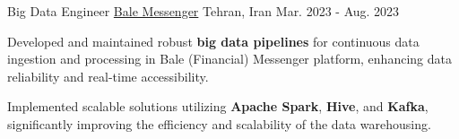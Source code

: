 

\begin{cventries}

  \cventry
    {Big Data Engineer} %
    {\href{https://bale.ai/}{Bale Messenger}} %
    {Tehran, Iran} %
    {Mar. 2023 - Aug. 2023} %
    {
      \begin{cvitems} %
        \item {Developed and maintained robust \textbf{big data pipelines} for continuous data ingestion and processing in Bale (Financial) Messenger platform, enhancing data reliability and real-time accessibility.}
        \item {Implemented scalable solutions utilizing \textbf{Apache Spark}, \textbf{Hive}, and \textbf{Kafka}, significantly improving the efficiency and scalability of the data warehousing.}
      \end{cvitems}
    }



\end{cventries}
